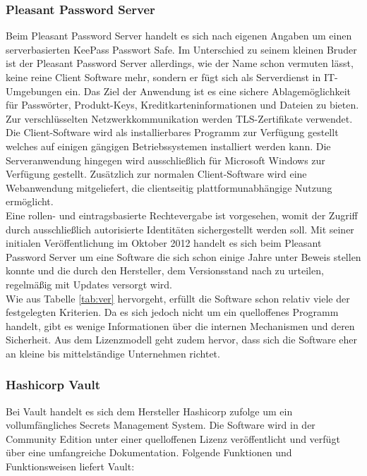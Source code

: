 \documentclass[
book,
a4paper,   
titlepage,  
halfparskip,
12pt        
]{scrartcl}
\begin{document}
\begin{onehalfspacing}
\subsubsection{Pleasant Password Server}
Beim Pleasant Password Server handelt es sich nach eigenen Angaben um einen serverbasierten KeePass Passwort Safe\cite{pleasant}. Im Unterschied zu seinem kleinen Bruder ist der Pleasant Password Server allerdings, wie der Name schon vermuten lässt, keine reine Client Software mehr, sondern er fügt sich als Serverdienst in \ac{IT}-Umgebungen ein. Das Ziel der Anwendung ist es eine sichere Ablagemöglichkeit für Passwörter, Produkt-Keys, Kreditkarteninformationen und Dateien zu bieten. Zur verschlüsselten Netzwerkkommunikation werden \ac{TLS}-Zertifikate verwendet. Die Client-Software wird als installierbares Programm zur Verfügung gestellt welches auf einigen gängigen Betriebssystemen installiert werden kann. Die Serveranwendung hingegen wird ausschließlich für Microsoft Windows zur Verfügung gestellt. Zusätzlich zur normalen Client-Software wird eine Webanwendung mitgeliefert, die clientseitig plattformunabhängige Nutzung ermöglicht.\cite{pleasant}\\
Eine rollen- und eintragsbasierte Rechtevergabe ist vorgesehen, womit der Zugriff durch ausschließlich autorisierte Identitäten sichergestellt werden soll. Mit seiner initialen Veröffentlichung im Oktober 2012 handelt es sich beim Pleasant Password Server um eine Software die sich schon einige Jahre unter Beweis stellen konnte und die durch den Hersteller, dem Versionsstand nach zu urteilen, regelmäßig mit Updates versorgt wird.\cite{pleasant}\\
Wie aus Tabelle \vref{tab:ver} hervorgeht, erfüllt die Software schon relativ viele der festgelegten Kriterien. Da es sich jedoch nicht um ein quelloffenes Programm handelt, gibt es wenige Informationen über die internen Mechanismen und deren Sicherheit. Aus dem Lizenzmodell geht zudem hervor, dass sich die Software eher an kleine bis mittelständige Unternehmen richtet.

\subsubsection{Hashicorp Vault}
\label{subsubsec:vault}
Bei Vault handelt es sich dem Hersteller Hashicorp zufolge um ein vollumfängliches Secrets Management System. Die Software wird in der Community Edition unter einer quelloffenen Lizenz veröffentlicht und verfügt über eine umfangreiche Dokumentation. Folgende Funktionen und Funktionsweisen liefert Vault:\cite{vaultintro}


\end{onehalfspacing}
\end{document}
